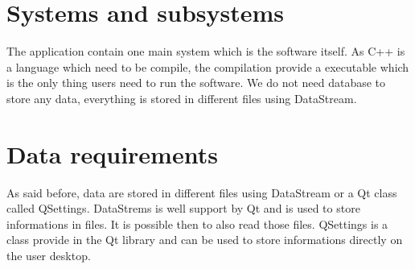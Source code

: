\section{Systems and subsystems}
The application contain one main system which is the software itself. As C++ is a language which need to be compile, the compilation provide a executable which is the only thing users need to run the software.
We do not need database to store any data, everything is stored in different files using DataStream.  

\section{Data requirements}
As said before, data are stored in different files using DataStream or a Qt class called QSettings. DataStrems is well support by Qt and is used to store informations in files. It is possible then to also read those files. QSettings is a class provide in the Qt library and can be used to store informations directly on the user desktop.

